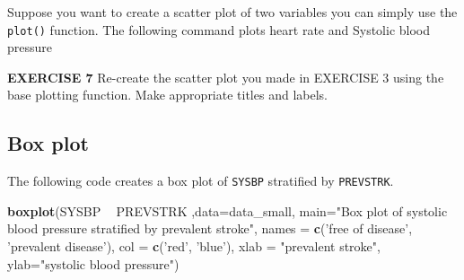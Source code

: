 \documentclass[
]{article}
\newenvironment{Shaded}{\begin{snugshade}}{\end{snugshade}}
\newcommand{\DataTypeTok}[1]{\textcolor[rgb]{0.13,0.29,0.53}{#1}}
\newcommand{\KeywordTok}[1]{\textcolor[rgb]{0.13,0.29,0.53}{\textbf{#1}}}
\newcommand{\NormalTok}[1]{#1}
\newcommand{\OperatorTok}[1]{\textcolor[rgb]{0.81,0.36,0.00}{\textbf{#1}}}
\newcommand{\StringTok}[1]{\textcolor[rgb]{0.31,0.60,0.02}{#1}}
\begin{document}
Suppose you want to create a scatter plot of two variables you can
simply use the \texttt{plot()} function. The following command plots
heart rate and Systolic blood pressure

\begin{Shaded}
\end{Shaded}

\textbf{EXERCISE 7} Re-create the scatter plot you made in EXERCISE 3
using the base plotting function. Make appropriate titles and labels.

\begin{Shaded}
\end{Shaded}

\hypertarget{box-plot}{%
\subsection{Box plot}\label{box-plot}}

The following code creates a box plot of \texttt{SYSBP} stratified by
\texttt{PREVSTRK}.

\begin{Shaded}
\begin{Highlighting}[]
\KeywordTok{boxplot}\NormalTok{(SYSBP }\OperatorTok{~}\StringTok{ }\NormalTok{PREVSTRK ,}\DataTypeTok{data=}\NormalTok{data_small, }
        \DataTypeTok{main=}\StringTok{"Box plot of systolic blood pressure stratified }
\StringTok{        by prevalent stroke"}\NormalTok{,}
        \DataTypeTok{names =} \KeywordTok{c}\NormalTok{(}\StringTok{'free of disease'}\NormalTok{, }\StringTok{'prevalent disease'}\NormalTok{),}
        \DataTypeTok{col =} \KeywordTok{c}\NormalTok{(}\StringTok{'red'}\NormalTok{, }\StringTok{'blue'}\NormalTok{),}
        \DataTypeTok{xlab =} \StringTok{"prevalent stroke"}\NormalTok{, }\DataTypeTok{ylab=}\StringTok{"systolic blood pressure"}\NormalTok{)}
\end{Highlighting}
\end{Shaded}
\end{document}
